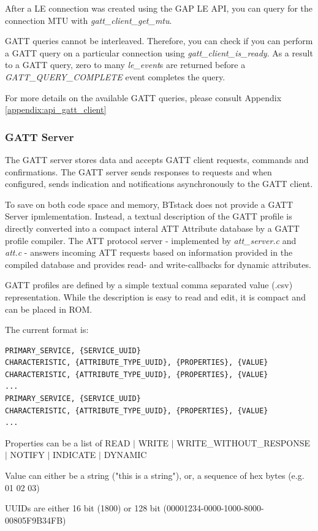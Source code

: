 After a LE connection was created using the GAP LE API, you can query for the connection MTU with \emph{gatt\_client\_get\_mtu}.

GATT queries cannot be interleaved. Therefore, you can check if you can perform a GATT query on a particular connection using \emph{gatt\_client\_is\_ready}. As a result to a GATT query, zero to many \emph{le\_event}s are returned before a \emph{GATT\_QUERY\_COMPLETE} event completes the query.

For more details on the available GATT queries, please consult Appendix \ref{appendix:api_gatt_client}

\subsubsection{GATT Server}
The GATT server stores data and accepts GATT client requests, commands and confirmations. The GATT server sends responses to requests and when configured, sends indication and notifications asynchronously to the GATT client. 

To save on both code space and memory, BTstack does not provide a GATT Server ipmlementation. Instead, a textual description of the GATT profile is directly converted into a compact interal ATT Attribute database by a GATT profile compiler. The ATT protocol server - implemented by  \emph{att\_server.c} and \emph{att.c}  - answers incoming ATT requests based on information provided in the compiled database and provides read- and write-callbacks for dynamic attributes.

GATT profiles are defined by a simple textual comma separated value (.csv) representation. While the description is easy to read and edit, it is compact and can be placed in ROM.

The current format is: 
\begin{lstlisting}
PRIMARY_SERVICE, {SERVICE_UUID}
CHARACTERISTIC, {ATTRIBUTE_TYPE_UUID}, {PROPERTIES}, {VALUE}
CHARACTERISTIC, {ATTRIBUTE_TYPE_UUID}, {PROPERTIES}, {VALUE}
...
PRIMARY_SERVICE, {SERVICE_UUID}
CHARACTERISTIC, {ATTRIBUTE_TYPE_UUID}, {PROPERTIES}, {VALUE}
...
\end{lstlisting}

Properties can be a list of READ $|$ WRITE $|$ WRITE\_WITHOUT\_RESPONSE $|$ NOTIFY $|$ INDICATE $|$ DYNAMIC

Value can either be a string ("this is a string"), or, a sequence of hex bytes (e.g. 01 02 03)

UUIDs are either 16 bit (1800) or 128 bit (00001234-0000-1000-8000-00805F9B34FB)

